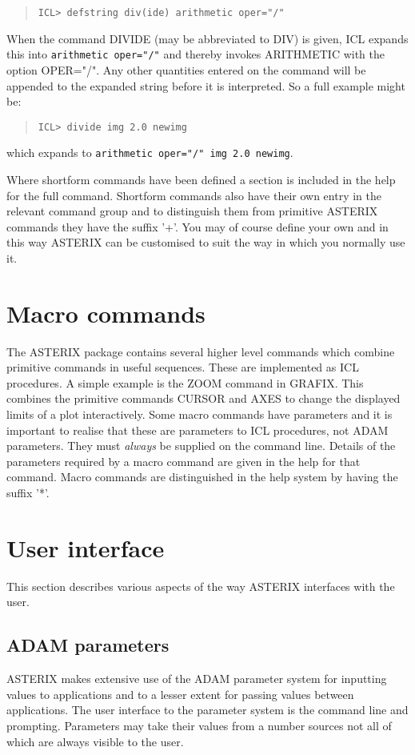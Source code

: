 \documentclass{book}
\renewcommand{\_}{{\tt\char'137}}     %
\begin{document}
\begin{quote}\begin{verbatim}
ICL> defstring div(ide) arithmetic oper="/"
\end{verbatim}\end{quote}
When the command DIVIDE (may be abbreviated to DIV) is given, ICL
expands this into {\tt arithmetic oper="/"} and thereby invokes
ARITHMETIC with the option OPER="/". Any other quantities entered
on the command will be appended to the expanded string before it
is interpreted. So a full example might be:

\begin{quote}\begin{verbatim}
ICL> divide img 2.0 newimg
\end{verbatim}\end{quote}
which expands to {\tt arithmetic oper="/" img 2.0 newimg}.

Where shortform commands have been defined a section is included
in the help for the full command. Shortform commands also have
their own entry in the relevant command group and to distinguish
them from primitive ASTERIX commands they have the suffix '+'.
You may of course define your own and in this way ASTERIX can be
customised to suit the way in which you normally use it.

\chapter{Macro commands}
The ASTERIX package contains several higher level commands which
combine primitive commands in useful sequences. These are
implemented as ICL procedures. A simple example is the ZOOM
command in GRAFIX. This combines the primitive commands CURSOR
and AXES to change the displayed limits of a plot interactively.
Some macro commands have parameters and it is important to realise
that these are parameters to ICL procedures, not ADAM parameters.
They must {\em always} be supplied on the command line. Details of the
parameters required by a macro command are given in the help for
that command. Macro commands are distinguished in the help system
by having the suffix '*'.

\chapter{User interface}
This section describes various aspects of the way ASTERIX
interfaces with the user.

\section{ADAM parameters}
ASTERIX makes extensive use of the ADAM parameter system for
inputting values to applications and to a lesser extent for
passing values between applications. The user interface to the
parameter system is the command line and prompting. Parameters
may take their values from a number sources not all of which are
always visible to the user.
\end{document}
